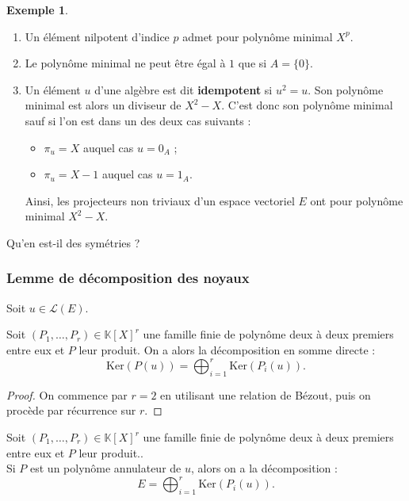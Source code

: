 \documentclass[french]{article}
\newcommand{\K}{\mathbb{K}}
\renewcommand{\ker}{\text{Ker}}
\theoremstyle{plain}
\theoremstyle{definition}
\newtheorem*{ex}{Exemple}
\theoremstyle{remark}
\begin{document}
\begin{ex}
	\begin{enumerate}
		\item Un élément nilpotent d'indice $p$ admet pour polynôme minimal $X^p$.
		\item Le polynôme minimal ne peut être égal à $1$ que si $A=\{0\}$.
		\item Un élément $u$ d'une algèbre est dit \textbf{idempotent} si $u^2=u$. Son polynôme minimal est alors un diviseur de $X^2-X$. C'est donc son polynôme minimal sauf si l'on est dans un des deux cas suivants :
		\begin{itemize}
			\item $\pi_u=X$ auquel cas $u=0_A$ ;
			\item $\pi_u=X-1$ auquel cas $u=1_A$.
		\end{itemize}
		Ainsi, les projecteurs non triviaux d'un espace vectoriel $E$ ont pour polynôme minimal $X^2-X$.
	\end{enumerate}
\end{ex}

\begin{exo}
	Qu'en est-il des symétries ?
\end{exo}

\subsubsection*{Lemme de décomposition des noyaux}

Soit $u\in\mathcal{L}(E)$.

\begin{thm}%
	Soit $(P_1,\ldots,P_r)\in\K[X]^r$ une famille finie de polynôme deux à deux premiers entre eux et $P$ leur produit. On a alors la décomposition en somme directe : $$\ker(P(u))=\bigoplus_{i=1}^r\ker(P_i(u)).$$
\end{thm}
\begin{proof}
	On commence par $r=2$ en utilisant une relation de Bézout, puis on procède par récurrence sur $r$.
\end{proof}

\begin{cor}%
	Soit $(P_1,\ldots,P_r)\in\K[X]^r$ une famille finie de polynôme deux à deux premiers entre eux et $P$ leur produit.. \\
	Si $P$ est un polynôme annulateur de $u$, alors on a la décomposition :
	$$E=\bigoplus_{i=1}^r\ker(P_i(u)).$$
\end{cor}
\end{document}
